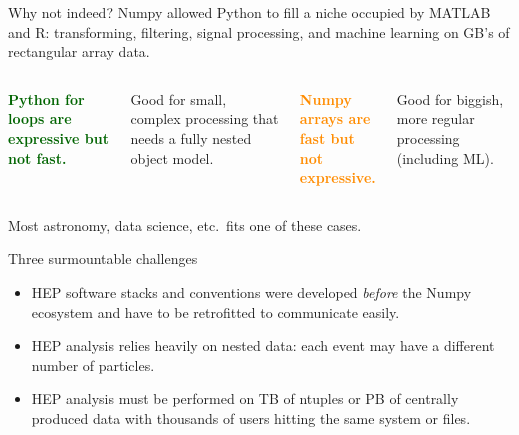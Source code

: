 \documentclass[aspectratio=169]{beamer}
\begin{document}
\begin{frame}{Why not indeed?}
\vspace{0.5 cm}
Numpy allowed Python to fill a niche occupied by MATLAB and R: transforming, filtering, signal processing, and machine learning on GB's of rectangular array data.

\vspace{0.75 cm}
\begin{columns}[t]

\textcolor{darkgreen}{\bf Python for loops are expressive but not fast.}

\vspace{0.25 cm}
Good for small, complex processing that needs a fully nested object model.

\textcolor{darkorange}{\bf Numpy arrays are \\ fast but not expressive.}

\vspace{0.25 cm}
Good for biggish, more regular processing (including ML).

\end{columns}

\vspace{0.75 cm}
Most astronomy, data science, etc.\ fits one of these cases.
\end{frame}

\begin{frame}{Three surmountable challenges}
\large
\vspace{0.5 cm}
\begin{itemize}\setlength{\itemsep}{1 cm}
\item HEP software stacks and conventions were developed {\it before} the Numpy ecosystem and have to be retrofitted to communicate easily.

\item HEP analysis relies heavily on nested data: each event may have a different number of particles.

\item HEP analysis must be performed on TB of ntuples or PB of centrally produced data with thousands of users hitting the same system or files.
\end{itemize}
\end{frame}
\end{document}
